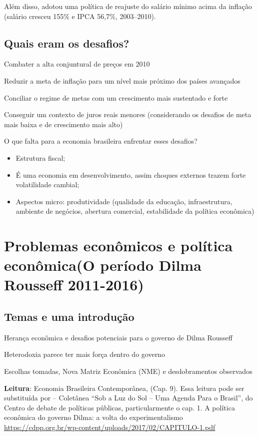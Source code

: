 \documentclass[a4paper,12pt]{article}[abntex2]
\begin{document}
Além disso, adotou uma política de reajuste do salário mínimo acima da inflação (salário cresceu 155\% e IPCA 56,7\%, 2003--2010).

\subsection{\textbf{Quais eram os desafios?}}
Combater a alta conjuntural de preços em 2010

Reduzir a meta de inflação para um nível mais próximo dos países avançados

Conciliar o regime de metas com um crescimento mais sustentado e forte

Conseguir um contexto de juros reais menores (considerando os desafios de meta mais baixa e de crescimento mais alto)

O que falta para a economia brasileira enfrentar esses desafios?\begin{itemize}
    \item Estrutura fiscal;
    \item É uma economia em desenvolvimento, assim choques externos trazem forte volatilidade cambial;
    \item Aspectos micro: produtividade (qualidade da educação, infraestrutura, ambiente de negócios, abertura comercial, estabilidade da política econômica) 
\end{itemize}

\newpage
\section{\textbf{Problemas econômicos e política econômica(O período Dilma Rousseff 2011-2016)}}

\subsection{\textbf{Temas e uma introdução}}

Herança econômica e desafios potenciais para o governo de Dilma Rousseff

Heterodoxia parece ter mais força dentro do governo

Escolhas tomadas, Nova Matriz Econômica (NME) e desdobramentos observados

\textbf{Leitura}: Economia Brasileira Contemporânea, (Cap. 9). Essa leitura pode ser substituída por – Coletânea “Sob a Luz do Sol – Uma Agenda Para o Brasil”, do Centro de debate de políticas públicas, particularmente o cap. 1. A política econômica do governo Dilma: a volta do experimentalismo \url{https://cdpp.org.br/wp-content/uploads/2017/02/CAPITULO-1.pdf}
\end{document}
